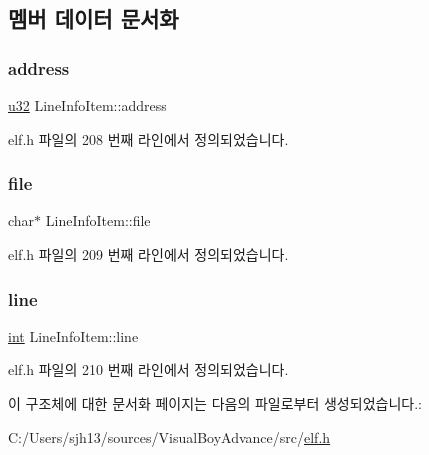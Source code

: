\subsection{멤버 데이터 문서화}
\mbox{\label{struct_line_info_item_aa5147adab5d2634bec7965619b5773ab}} 
\subsubsection{\texorpdfstring{address}{address}}
{\footnotesize\ttfamily \mbox{\hyperlink{_system_8h_a10e94b422ef0c20dcdec20d31a1f5049}{u32}} Line\+Info\+Item\+::address}



elf.\+h 파일의 208 번째 라인에서 정의되었습니다.

\mbox{\label{struct_line_info_item_a61a140c862884d34fbf8e13e16ee17af}} 
\subsubsection{\texorpdfstring{file}{file}}
{\footnotesize\ttfamily char$\ast$ Line\+Info\+Item\+::file}



elf.\+h 파일의 209 번째 라인에서 정의되었습니다.

\mbox{\label{struct_line_info_item_aa1c188f0239f74291b066489d1bc86c2}} 
\subsubsection{\texorpdfstring{line}{line}}
{\footnotesize\ttfamily \mbox{\hyperlink{_util_8cpp_a0ef32aa8672df19503a49fab2d0c8071}{int}} Line\+Info\+Item\+::line}



elf.\+h 파일의 210 번째 라인에서 정의되었습니다.



이 구조체에 대한 문서화 페이지는 다음의 파일로부터 생성되었습니다.\+:\begin{DoxyCompactItemize}
\item 
C\+:/\+Users/sjh13/sources/\+Visual\+Boy\+Advance/src/\mbox{\hyperlink{elf_8h}{elf.\+h}}\end{DoxyCompactItemize}
